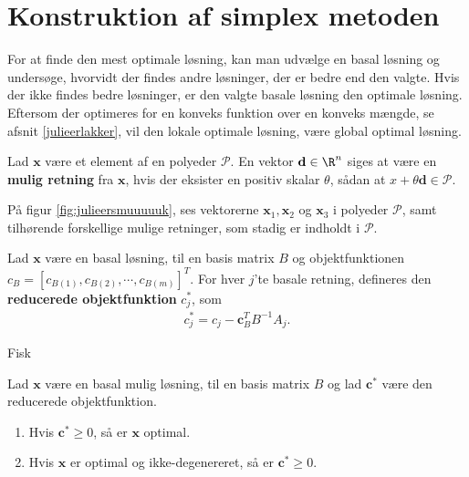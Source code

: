 %
\section{Konstruktion af simplex metoden}
%
For at finde den mest optimale løsning, kan man udvælge en basal løsning og undersøge, hvorvidt der findes andre løsninger, der er bedre end den valgte. 
Hvis der ikke findes bedre løsninger, er den valgte basale løsning den optimale løsning. 
Eftersom der optimeres for en konveks funktion over en konveks mængde, se afsnit \ref{julieerlakker}, %
vil den lokale optimale løsning, være global optimal løsning. 
%
%
\begin{defn}{}{}
Lad $\textbf{x}$ være et element af en polyeder $\mathcal{P}$.
En vektor $\textbf{d}\in \R^n$ siges at være en  \textbf{mulig retning} fra $\textbf{x}$, hvis der eksister en positiv skalar $\theta$, sådan at $x+\theta \textbf{d}\in \mathcal{P}$.
\end{defn}
\noindent
%
På figur \ref{fig:julieersmuuuuuk}, ses vektorerne $\mathbf{x}_1, \mathbf{x}_2$ og $\mathbf{x}_3$ i polyeder $\mathcal{P}$, samt tilhørende forskellige mulige retninger, som stadig er indholdt i $\mathcal{P}$.
%

%
%
%
\begin{defn}{}{}
Lad $\mathbf{x}$ være en basal løsning, til en basis matrix $B$ og objektfunktionen $c_B=[ c_{B(1)},c_{B(2)}, \cdots , c_{B(m)} ]^T.$
For hver $j$'te basale retning, defineres den \textbf{reducerede objektfunktion} $c_j^*$, som
\begin{align*}
c_j^* = c_j - \mathbf{c}_B^T B^{-1}A_j.
\end{align*} 
%
\end{defn}
\noindent
%
Fisk
%
\begin{thm}{}{}
Lad $\mathbf{x}$ være en basal mulig løsning, til en basis matrix $B$ og lad $\mathbf{c}^*$ være den reducerede objektfunktion. 
\begin{enumerate}[label = (\alph*)]
\item Hvis $\mathbf{c}^* \geq 0$, så er $\mathbf{x}$ optimal.
\item Hvis $\mathbf{x}$ er optimal og ikke-degenereret, så er $\mathbf{c}^* \geq 0$.
\end{enumerate}
\end{thm}
